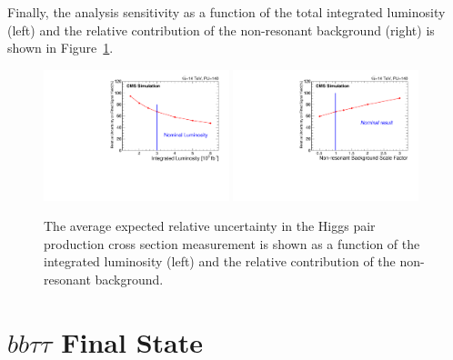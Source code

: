 Finally, the analysis sensitivity as a function of the total integrated luminosity (left) and the relative contribution of the non-resonant background (right) is shown in Figure~\ref{fig:LumiScan}.

\begin{figure}[h]
  \centering
  \includegraphics[width=0.48\textwidth]{figures_chapter6/XSUncertaintyVsLumi.pdf}
 \includegraphics[width=0.48\textwidth]{figures_chapter6/XSUncertaintyVsNonResBkgScaleFactor.pdf} 
  \caption {The average expected relative uncertainty in the Higgs pair production cross section measurement is shown  as a function of the integrated luminosity (left) and the relative contribution of the non-resonant background.}
  \label{fig:LumiScan}
\end{figure}


\section{$bb\tau\tau$ Final State}

